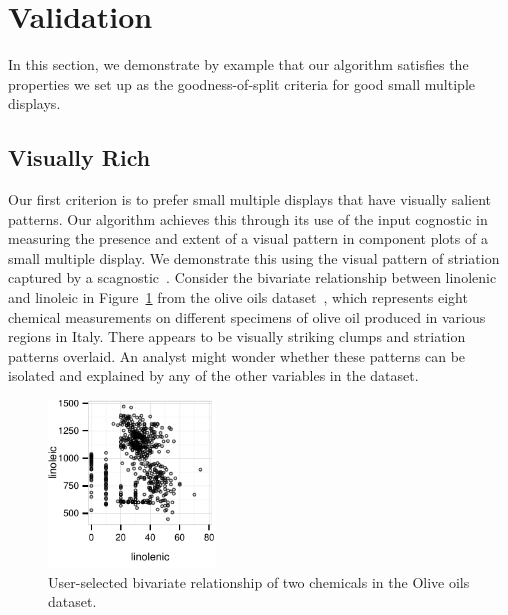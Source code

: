 \section{Validation}
\label{sec:evaluation}
In this section, we demonstrate by example that our algorithm satisfies the properties we set up as the goodness-of-split criteria for good small multiple displays.


\subsection{Visually Rich}
Our first criterion is to prefer small multiple displays that have visually salient patterns. Our algorithm achieves this through its use of the input cognostic  in measuring the presence and extent of a visual pattern in component plots of a small multiple display. 
We demonstrate this using the visual pattern of striation captured by a scagnostic~\cite{Wilkinson2005}. Consider the bivariate relationship between linolenic and linoleic in Figure~\ref{fig:vrich_all} from the olive oils dataset~\cite{Forina1983}, which represents eight chemical measurements on different specimens of olive oil produced in various regions in Italy. There appears to be visually striking clumps and striation patterns overlaid. An analyst might wonder whether these patterns can be isolated and explained by any of the other variables in the dataset.

\begin{figure}
 \centering 
	\includegraphics[width=1.75in]{images/linolenic-linoleic.pdf}
	  \caption{User-selected bivariate relationship of two chemicals in the Olive oils dataset. }
	 \label{fig:vrich_all}
\end{figure}

